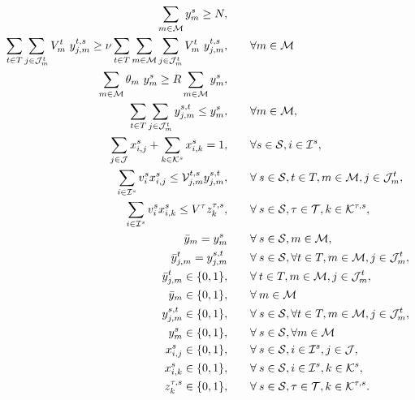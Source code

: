 \documentclass[a4paper,11pt]{article}
\begin{document}
	\begin{alignat}{2}
		\sum\limits_{m \in \cal {M}} y^s_{m}\geq{N}, & \qquad
		\label{eq:depph:3}\\
		\sum\limits_{t \in T} \sum\limits_{j \in {\cal J}^t_{m}} V_{m}^{t} \ y^{t,s}_{j,m} \geq \nu \sum\limits_{t \in T} \sum\limits_{m \in {\cal M}} \sum\limits_{j \in {\cal J}^t_{m}} V_{m}^{t} \ y^{t,s}_{j,m}, & \qquad \forall m \in {\cal M}
		\label{eq:depph:3.2}\\
		\sum\limits_{m \in {\cal M}} \theta_{m} \ y^s_{m} \geq R \sum\limits_{m \in {\cal M}} y^s_{m}, & \qquad \label{eq:depph:4}\\
		\sum\limits_{t \in T} \sum\limits_{j \in {\cal J}^t_{m}} y^{s,t}_{j,m} \leq y^s_{m}, & \qquad \forall m \in \cal M, \label{eq:depph:5}\\
		\sum\limits_{j \in \cal J}x_{i,j}^{s} + \sum\limits_{k \in {\cal K}^{s}}x_{i,k}^{s} = 1, & \qquad \forall s \in {\cal S}, i \in {\cal I}^{s}, \label{eq:depph:9}\\
		\sum\limits_{i \in {\cal I}^{s}}v_i^{s} x_{i,j}^{s} \leq {\cal V}_{j,m}^{t,s} y^{s,t}_{j,m}, & \qquad \forall \: s \in {\cal S}, t \in T, m\in{{\cal M}}, j \in {\cal J}^t_{m}, \label{eq:depph:10}\\
		\sum\limits_{i \in {\cal I}^{s}} v_i^{s} x_{i,k}^{s} \leq V^{\tau} z_k^{\tau,s}, & \qquad \forall \: s \in {\cal S}, \tau \in {\cal T}, k \in {\cal K}^{\tau,s}, \label{eq:depph:11}\\
		\bar{y}_{m} = y^{s}_{m} & \qquad \forall \: s \in {\cal S}, m \in {\cal M}, \label{eq:depph:nas}\\
		\bar{y}^t_{j,m} = y^{s,t}_{j,m} & \qquad \forall \: s \in {\cal S}, \forall t \in T, m \in {\cal M}, j \in {\cal J}^t_{m}, \label{eq:depph:nab}\\
		\bar{y}^{t}_{j,m} \in \{0, 1\}, & \qquad \forall \: t \in T, m \in {\cal M}, j \in {\cal J}^t_{m}, \label{eq:depph:6.1}\\
		\bar{y}_{m} \in \{0, 1\}, & \qquad \forall \: m \in \cal M \label{eq:depph:7.1}\\
		y^{s,t}_{j,m} \in \{0, 1\}, & \qquad \forall \: s \in {\cal S}, \forall t \in T, m \in {\cal M}, j \in {\cal J}^t_{m}, \label{eq:depph:6}\\
		y^s_{m} \in \{0, 1\}, & \qquad \forall \: s \in {\cal S}, \forall m \in \cal M \label{eq:depph:7}\\
		x_{i,j}^{s} \in \{0, 1\}, & \qquad \forall \: s \in {\cal S}, i \in {\cal I}^{s}, j \in {\cal J}, \label{eq:depph:12}\\
		x_{i,k}^{s} \in \{0, 1\}, & \qquad \forall \: s \in {\cal S}, i \in {\cal I}^{s}, k \in {\cal K}^{s}, \label{eq:depph:13}\\
		z_k^{\tau,s} \in \{0, 1\}, & \qquad \forall \: s \in {\cal S}, \tau \in {\cal T} , k \in {\cal K}^{\tau,s}. \label{eq:depph:14}
	\end{alignat}
\end{document}
